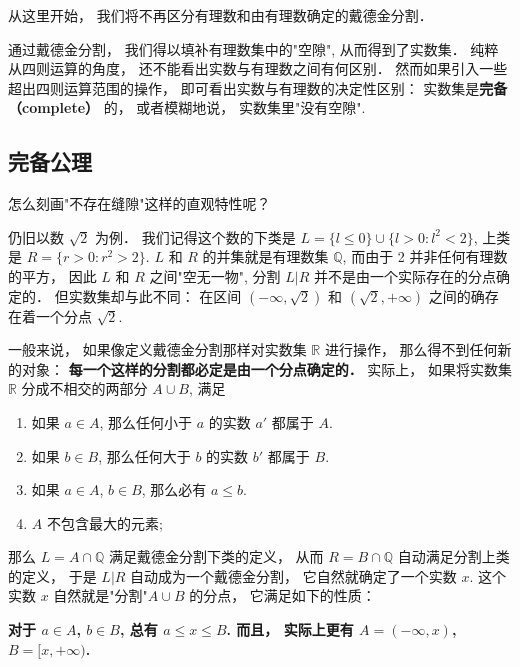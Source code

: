 
\begin{issues}
\issueTODO
{}
\end{issues}


从这里开始， 我们将不再区分有理数和由有理数确定的戴德金分割． 

通过戴德金分割， 我们得以填补有理数集中的"空隙", 从而得到了实数集． 纯粹从四则运算的角度， 还不能看出实数与有理数之间有何区别． 然而如果引入一些超出四则运算范围的操作， 即可看出实数与有理数的决定性区别： 实数集是\textbf{完备 （complete）} 的， 或者模糊地说， 实数集里"没有空隙".

\subsection{完备公理}

怎么刻画"不存在缝隙"这样的直观特性呢？

仍旧以数 $\sqrt{2}$ 为例． 我们记得这个数的下类是 $L=\{l\leq0\}\cup\{l>0:l^2<2\}$, 上类是 $R=\{r>0:r^2>2\}$. $L$ 和 $R$ 的并集就是有理数集 $\mathbb{Q}$, 而由于 2 并非任何有理数的平方， 因此 $L$ 和 $R$ 之间"空无一物", 分割 $L|R$ 并不是由一个实际存在的分点确定的． 但实数集却与此不同： 在区间 $(-\infty,\sqrt{2})$ 和 $(\sqrt{2},+\infty)$ 之间的确存在着一个分点 $\sqrt{2}$. 

一般来说， 如果像定义戴德金分割那样对实数集 $\mathbb{R}$ 进行操作， 那么得不到任何新的对象： \textbf{每一个这样的分割都必定是由一个分点确定的．} 实际上， 如果将实数集 $\mathbb{R}$ 分成不相交的两部分 $A\cup B$, 满足

\begin{enumerate}
\item 如果 $a\in A$, 那么任何小于 $a$ 的实数 $a'$ 都属于 $A$.
\item 如果 $b\in B$, 那么任何大于 $b$ 的实数 $b'$ 都属于 $B$.
\item 如果 $a\in A$, $b\in B$, 那么必有 $a\leq b$.
\item $A$ 不包含最大的元素;
\end{enumerate}

那么 $L=A\cap\mathbb{Q}$ 满足戴德金分割下类的定义， 从而 $R=B\cap\mathbb{Q}$ 自动满足分割上类的定义， 于是 $L|R$ 自动成为一个戴德金分割， 它自然就确定了一个实数 $x$. 这个实数 $x$ 自然就是"分割"$A\cup B$ 的分点， 它满足如下的性质：

\textbf{对于 $a\in A$, $b\in B$, 总有 $a\leq x\leq B$. 而且， 实际上更有 $A=(-\infty,x)$, $B=[x,+\infty)$.}

